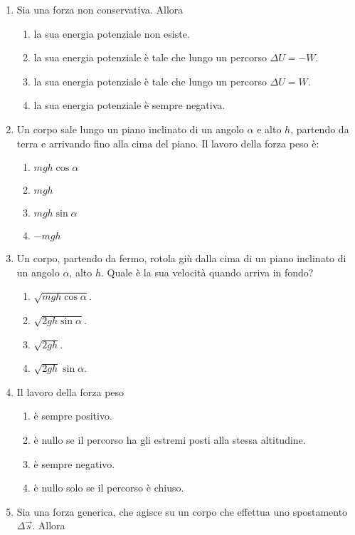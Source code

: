 \documentclass{article}
\begin{document}
\begin{enumerate}
  \item Sia  una forza non conservativa. Allora
  \begin{enumerate}[label=\Alph*.]
    \item la sua energia potenziale non esiste.
    \item la sua energia potenziale è tale che lungo un percorso $\Delta U=-W$.
    \item la sua energia potenziale è tale che lungo un percorso $\Delta U=W$.
    \item la sua energia potenziale è sempre negativa.
  \end{enumerate}
  \item Un corpo sale lungo un piano inclinato di un angolo $\alpha$ e alto $h$, partendo da terra e arrivando fino alla cima del piano. Il lavoro della forza peso è:
  \begin{enumerate}[label=\Alph*.]
    \item $mgh\cos\alpha$
    \item $mgh$
    \item $mgh\sin\alpha$
    \item $-mgh$
  \end{enumerate}
  \item Un corpo, partendo da fermo, rotola giù dalla cima di un piano inclinato di un angolo $\alpha$, alto $h$. Quale è la sua velocità quando arriva in fondo?
  \begin{enumerate}[label=\Alph*.]
    \item $\sqrt{mgh\cos\alpha}$.
    \item $\sqrt{2gh\sin\alpha}$.
    \item $\sqrt{2gh}$.
    \item $\sqrt{2gh}\sin\alpha$.
  \end{enumerate}
  \item Il lavoro della forza peso
  \begin{enumerate}[label=\Alph*.]
    \item è sempre positivo.
    \item è nullo se il percorso ha gli estremi posti alla stessa altitudine.
    \item è sempre negativo.
    \item è nullo solo se il percorso è chiuso.
  \end{enumerate}
  \item Sia  una forza generica, che agisce su un corpo che effettua uno spostamento $\Delta \vec{s}$. Allora

\end{enumerate}
\end{document}
